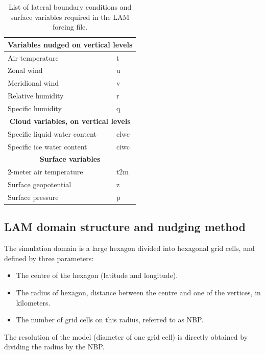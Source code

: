 \begin{table}[htbp]
\centering
\begin{tabular}{|l|l|}
\hline
\multicolumn{2}{|c|}{\textbf{Variables nudged on vertical levels}} \\ \hline
Air temperature                & t     \\ \hline
Zonal wind                    & u     \\ \hline
Meridional wind               & v     \\ \hline
Relative humidity             & r     \\ \hline
Specific humidity             & q     \\ \hline
\multicolumn{2}{|c|}{\textbf{Cloud variables, on vertical levels}} \\ \hline
Specific liquid water content & clwc  \\ \hline
Specific ice water content    & ciwc  \\ \hline
\multicolumn{2}{|c|}{\textbf{Surface variables}} \\ \hline
2-meter air temperature            & t2m   \\ \hline
Surface geopotential          & z     \\ \hline
Surface pressure              & p     \\ \hline
\end{tabular}
\caption{List of lateral boundary conditions and surface variables required in the LAM forcing file.}
\end{table}

\subsection{LAM domain structure and nudging method}

The simulation domain is a large hexagon divided into hexagonal grid cells, and defined by three parameters:
\begin{itemize}
    \item The centre of the hexagon (latitude and longitude).
    \item The radius of hexagon, distance between the centre and one of the vertices, in kilometers.
    \item The number of grid cells on this radius, referred to as NBP.
\end{itemize}

The resolution of the model (diameter of one grid cell) is directly obtained by dividing the radius by the NBP.

